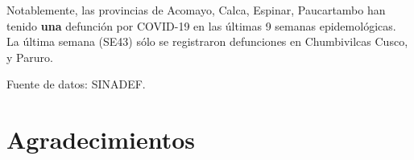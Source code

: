 \documentclass[12pt,a4paper,openany]{book}
\begin{document}
	Notablemente, las provincias de Acomayo, Calca, Espinar, Paucartambo han tenido \textbf{\color{mycolor2}una} defunción por COVID-19 en las últimas 9 semanas epidemológicas. La última semana (SE43) sólo se registraron defunciones en Chumbivilcas Cusco, y Paruro.
	\begin{table}[h]
		\resizebox{\textwidth}{!}{%
			
		}
		{\footnotesize {Fuente de datos: SINADEF.}}
	\end{table}
\pagebreak

	\section*{Agradecimientos}
		
\end{document}
